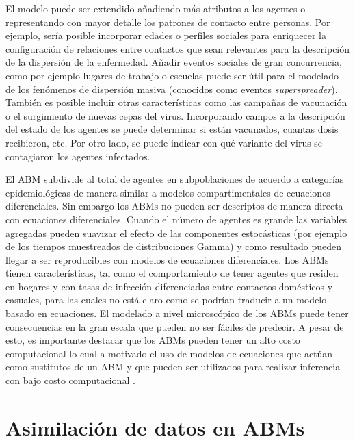 El modelo puede ser extendido añadiendo más atributos a los agentes o representando con mayor detalle los patrones de contacto entre personas. Por ejemplo, sería posible incorporar edades o perfiles sociales para enriquecer la configuración de relaciones entre contactos que sean relevantes para la descripción de la dispersión de la enfermedad. Añadir eventos sociales de gran concurrencia, como por ejemplo lugares de trabajo o escuelas puede ser útil para el modelado de los fenómenos de dispersión masiva (conocidos como eventos \textit{superspreader}). También es posible incluir otras características como las campañas de vacunación o el surgimiento de nuevas cepas del virus. Incorporando campos a la descripción del estado de los agentes se puede determinar si están vacunados, cuantas dosis recibieron, etc. Por otro lado, se puede indicar con qué variante del virus se contagiaron los agentes infectados.

El ABM subdivide al total de agentes en subpoblaciones de acuerdo a categorías epidemiológicas de manera similar a modelos compartimentales de ecuaciones diferenciales. Sin embargo los ABMs no pueden ser descriptos de manera directa con ecuaciones diferenciales. Cuando el número de agentes es grande las variables agregadas pueden suavizar el efecto de las componentes estocásticas (por ejemplo de los tiempos muestreados de distribuciones Gamma) y como resultado pueden llegar a ser reproducibles con modelos de ecuaciones diferenciales. Los ABMs tienen características, tal como el comportamiento de tener agentes que residen en hogares y con tasas de infección diferenciadas entre contactos domésticos y casuales, para las cuales no está claro como se podrían traducir a un modelo basado en ecuaciones. El modelado a nivel microscópico de los ABMs puede tener consecuencias en la gran escala que pueden no ser fáciles de predecir. A pesar de esto, es importante destacar que los ABMs pueden tener un alto costo computacional lo cual a motivado el uso de modelos de ecuaciones que actúan como sustitutos de un ABM y que pueden ser utilizados para realizar inferencia con bajo costo computacional \citep{Hooten2020}.

\section{Asimilación de datos en ABMs}

